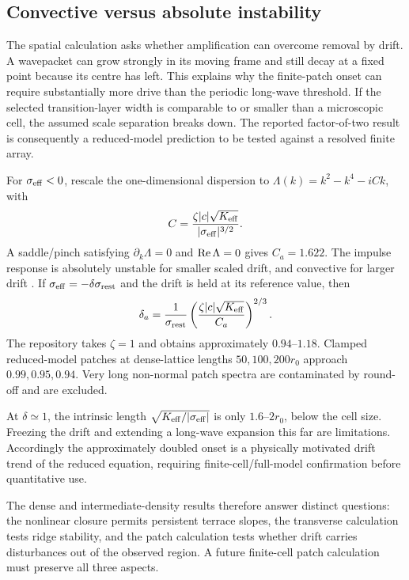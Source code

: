 \subsection{Convective versus absolute instability}


The spatial calculation asks whether amplification can overcome removal by drift. A wavepacket can grow strongly in its moving frame and still decay at a fixed point because its centre has left. This explains why the finite-patch onset can require substantially more drive than the periodic long-wave threshold. If the selected transition-layer width is comparable to or smaller than a microscopic cell, the assumed scale separation breaks down. The reported factor-of-two result is consequently a reduced-model prediction to be tested against a resolved finite array.


For $\sigma_{\rm eff}<0$, rescale the one-dimensional dispersion to $\Lambda(k)=k^2-k^4-iCk$, with
\begin{equation}
C=\frac{\zeta|c|\sqrt{K_{\rm eff}}}{|\sigma_{\rm eff}|^{3/2}}.
\end{equation}
A saddle/pinch satisfying $\partial_k\Lambda=0$ and $\operatorname{Re}\Lambda=0$ gives $C_a=1.622$. The impulse response is absolutely unstable for smaller scaled drift, and convective for larger drift \cite{huerre}. If $\sigma_{\rm eff}=-\delta\sigma_{\rm rest}$ and the drift is held at its reference value, then
\begin{equation}
\delta_a=\frac{1}{\sigma_{\rm rest}}\left(\frac{\zeta|c|\sqrt{K_{\rm eff}}}{C_a}\right)^{2/3}.
\end{equation}
The repository takes $\zeta=1$ and obtains approximately $0.94$--$1.18$. Clamped reduced-model patches at dense-lattice lengths $50,100,200r_0$ approach $0.99,0.95,0.94$. Very long non-normal patch spectra are contaminated by round-off and are excluded.

At $\delta\simeq1$, the intrinsic length $\sqrt{K_{\rm eff}/|\sigma_{\rm eff}|}$ is only $1.6$--$2r_0$, below the cell size. Freezing the drift and extending a long-wave expansion this far are limitations. Accordingly the approximately doubled onset is a physically motivated drift trend of the reduced equation, requiring finite-cell/full-model confirmation before quantitative use.


The dense and intermediate-density results therefore answer distinct questions: the nonlinear closure permits persistent terrace slopes, the transverse calculation tests ridge stability, and the patch calculation tests whether drift carries disturbances out of the observed region. A future finite-cell patch calculation must preserve all three aspects.



